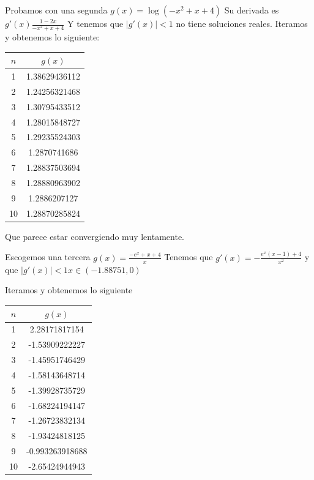 \documentclass{article}
\begin{document}
Probamos con una segunda $g(x) = \log( -x^2 + x +4)$
Su derivada es $g'(x)\frac{1-2x}{-x^2+x+4}$
Y tenemos que $|g'(x)|<1$ no tiene soluciones reales.
Iteramos y obtenemos lo siguiente:

\begin{center}
    \begin{tabular}{||c c||} 
    \hline
    $n$ & $g(x)$\\ [0.5ex] 
    \hline
    1 & 1.38629436112 \\
    \hline
    2 & 1.24256321468 \\
    \hline
    3 & 1.30795433512 \\
    \hline
    4 & 1.28015848727 \\ 
    \hline
    5 & 1.29235524303 \\
    \hline
    6 & 1.2870741686 \\
    \hline
    7 & 1.28837503694 \\
    \hline
    8 & 1.28880963902\\
    \hline
    9 & 1.2886207127 \\ 
    \hline
    10 & 1.28870285824 \\ [1ex]
   \end{tabular}
\end{center}

Que parece estar convergiendo muy lentamente.

Escogemos una tercera $g(x)= \frac{-e^x+x+4}{x}$
Tenemos que $g'(x) = - \frac{e^x(x-1)+4}{x^2}$
y que $|g'(x)|<1 x \in (-1.88751, 0)$

Iteramos y obtenemos lo siguiente

\begin{center}
    \begin{tabular}{||c c||} 
    \hline
    $n$ & $g(x)$\\ [0.5ex] 
    \hline
    1 & 2.28171817154  \\
    \hline
    2 & -1.53909222227 \\
    \hline
    3 & -1.45951746429 \\
    \hline
    4 & -1.58143648714 \\ 
    \hline
    5 & -1.39928735729 \\
    \hline
    6 & -1.68224194147 \\
    \hline
    7 & -1.26723832134 \\
    \hline
    8 & -1.93424818125\\
    \hline
    9 & -0.993263918688 \\ 
    \hline
    10 & -2.65424944943 \\ [1ex]
   \end{tabular}
\end{center}
\end{document}
